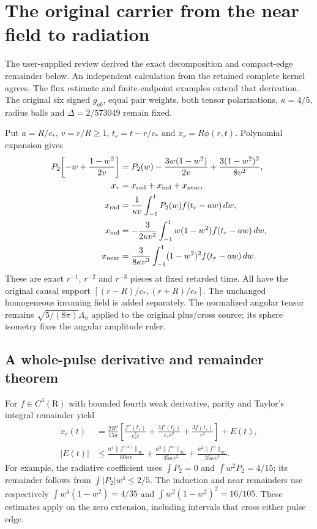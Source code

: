 \section{The original carrier from the near field to radiation}
\label{sec:actual-radiation-zone}
The user-supplied review derived the exact decomposition and compact-edge
remainder below. An independent calculation from the retained complete kernel
agrees. The flux estimate and finite-endpoint examples extend that derivation.
The original six signed $g_{ab}$, equal pair weights, both tensor polarizations,
$\kappa=4/5$, radius balls and $\Delta=2/573049$ remain fixed.

Put $a=R/c_*$, $v=r/R\geq1$, $t_r=t-r/c_*$ and
$x_r=R\phi(r,t)$. Polynomial expansion gives
\begin{align}
 P_2\!\left[-w+\frac{1-w^2}{2v}\right]
 &=P_2(w)-\frac{3w(1-w^2)}{2v}
             +\frac{3(1-w^2)^2}{8v^2},\\
 x_r&=x_{\rm rad}+x_{\rm ind}+x_{\rm near},\nonumber\\
 x_{\rm rad}&=\frac1{\kappa v}\int_{-1}^1P_2(w)f(t_r-aw)\,dw,\nonumber\\
 x_{\rm ind}&=-\frac3{2\kappa v^2}\int_{-1}^1w(1-w^2)f(t_r-aw)\,dw,\nonumber\\
 x_{\rm near}&=\frac3{8\kappa v^3}\int_{-1}^1(1-w^2)^2f(t_r-aw)\,dw.
 \label{eq:exact-three-radial-pieces}
\end{align}
These are exact $r^{-1}$, $r^{-2}$ and $r^{-3}$ pieces at fixed retarded time.
All have the original causal support $[(r-R)/c_*,(r+R)/c_*]$.
The unchanged homogeneous incoming field is added separately. The normalized
angular tensor remains $\sqrt{5/(8\pi)}\Lambda_n$ applied to the original
plus/cross source; its sphere isometry fixes the angular amplitude ruler.

\subsection{A whole-pulse derivative and remainder theorem}
For $f\in C^3(\mathrm R)$ with bounded fourth weak derivative, parity and
Taylor's integral remainder yield
\begin{align}
 x_r(t)&=\frac{2R^3}{15\kappa}
 \left[\frac{f''(t_r)}{c_*^2r}
       +\frac{3f'(t_r)}{c_*r^2}+\frac{3f(t_r)}{r^3}\right]+E(t),\\
 |E(t)|&\leq\frac{a^4\|f^{(4)}\|_\infty}{60\kappa v}
       +\frac{a^3\|f'''\|_\infty}{35\kappa v^2}
       +\frac{a^2\|f''\|_\infty}{35\kappa v^3}.
 \label{eq:compact-edge-radiation-remainder}
\end{align}
For example, the radiative coefficient uses
$\int P_2=0$ and $\int w^2P_2=4/15$; its remainder follows from
$\int |P_2|w^4\leq2/5$. The induction and near remainders use respectively
$\int w^4(1-w^2)=4/35$ and
$\int w^2(1-w^2)^2=16/105$. These estimates apply on the zero extension,
including intervals that cross either pulse edge.

